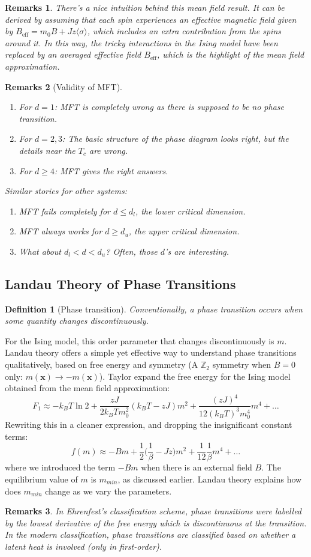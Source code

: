 \documentclass[a4paper]{article}
\newtheorem{remarks}{Remarks}[section]
\theoremstyle{new}
\newtheorem{defi}{Definition}[section]
\begin{document}
\begin{remarks}
There’s a nice intuition behind this mean field result. It can be derived by assuming that each spin experiences an effective magnetic field given by $B_{\text{eff}} = m_0B +Jz\langle\sigma\rangle$, which includes an extra contribution from the spins around it. In this way, the tricky interactions in the Ising model have been replaced by an averaged effective field $B_{\text{eff}}$, which is the highlight of the mean field approximation.
\end{remarks}
\begin{remarks}[Validity of MFT]\leavevmode
\begin{enumerate}
    \item For $d=1$: MFT is completely wrong as there is supposed to be no phase transition.
    \item For $d=2,3$: The basic structure of the phase diagram looks right, but the details near the $T_c$ are wrong.
    \item For $d\geq4$: MFT gives the right answers.
\end{enumerate}
Similar stories for other systems:
\begin{enumerate}
    \item MFT fails completely for $d\leq d_l$, the lower critical dimension.
    \item MFT always works for $d\geq d_u$, the upper critical dimension.
    \item What about $d_l<d<d_u$? Often, those $d$'s are interesting.
\end{enumerate}
\end{remarks}
\newpage
\subsection{Landau Theory of Phase Transitions}
\begin{defi}[Phase transition]
Conventionally, a phase transition occurs when some quantity changes discontinuously.
\end{defi}
For the Ising model, this order parameter that changes discontinuously is $m$. Landau theory offers a simple yet effective way to understand phase transitions qualitatively, based on free energy and symmetry (A $\mathbb{Z}_2$ symmetry when $B=0$ only: $m(\mathbf{x})\rightarrow-m(\mathbf{x})$). Taylor expand the free energy for the Ising model obtained from the mean field approximation:
$$F_1\approx -k_BT\ln 2+\frac{zJ}{2k_BTm_0^2}(k_BT-zJ)m^2+\frac{(zJ)^4}{12(k_BT)^3m_0^4}m^4+\dots$$
Rewriting this in a cleaner expression, and dropping the insignificant constant terms:
$$f(m)\approx-Bm+\frac{1}{2}\bigg(\frac{1}{\beta}-Jz\bigg)m^2+\frac{1}{12}\frac{1}{\beta}m^4+\dots$$
where we introduced the term $-Bm$ when there is an external field $B$. The equilibrium value of $m$ is $m_{min}$, as discussed earlier. Landau theory explains how does $m_{min}$ change as we vary the parameters.
\begin{remarks}
In Ehrenfest's classification scheme, phase transitions were labelled by the lowest derivative of the free energy which is discontinuous at the transition. In the modern classification, phase transitions are classified based on whether a latent heat is involved (only in first-order).
\end{remarks}
\end{document}
